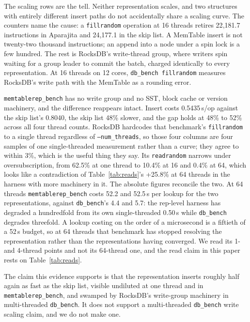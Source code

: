 \documentclass[conference]{IEEEtran}
\begin{document}
The scaling rows are the tell. Neither representation scales, and two structures
with entirely different insert paths do not accidentally share a scaling curve.
The counters name the cause: a \texttt{fillrandom} operation at 16 threads retires
22{,}181.7 instructions in Aparajita and 24{,}177.1 in the skip list. A MemTable
insert is not twenty-two thousand instructions; an append into a node under a spin
lock is a few hundred. The rest is RocksDB's write-thread group, where writers
spin waiting for a group leader to commit the batch, charged identically to every
representation. At 16 threads on 12 cores, \texttt{db\_bench fillrandom} measures
RocksDB's write path with the MemTable as a rounding error.

\texttt{memtablerep\_bench} has no write group and no SST, block cache or version
machinery, and the difference reappears intact. Insert costs 0.5435\,\textmu s/op
against the skip list's 0.8040, the skip list 48\% slower, and the gap holds at
48\% to 52\% across all four
thread counts. RocksDB hardcodes that benchmark's \texttt{fillrandom} to a single
thread regardless of \texttt{--num\_threads}, so those four columns are four
samples of one single-threaded measurement rather than a curve; they agree to
within 3\%, which is the useful thing they say. Its \texttt{readrandom} narrows under oversubscription, from 62.5\% at one thread
to 10.4\% at 16 and 0.4\% at 64, which looks like a contradiction of
Table~\ref{tab:reads}'s +25.8\% at 64 threads in the harness with more machinery in
it. The absolute figures reconcile the two. At 64 threads
\texttt{memtablerep\_bench} costs 52.2 and 52.5\,\textmu s per lookup for the two
representations, against \texttt{db\_bench}'s 4.4 and 5.7: the rep-level harness has
degraded a hundredfold from its own single-threaded 0.50\,\textmu s while
\texttt{db\_bench} degrades threefold. A lookup costing on the order of a
microsecond is a fiftieth of a 52\,\textmu s budget, so at 64 threads that benchmark
has stopped resolving the representation rather than the representations having
converged. We read its 1- and 4-thread points and not its 64-thread one, and the
read claim in this paper rests on Table~\ref{tab:reads}.

The claim this evidence supports is that the representation inserts roughly half
again as fast as the skip list, visible undiluted at one thread and in
\texttt{memtablerep\_bench}, and swamped by RocksDB's write-group machinery in
multi-threaded \texttt{db\_bench}. It does not support a multi-threaded
\texttt{db\_bench} write scaling claim, and we do not make one.
\end{document}
